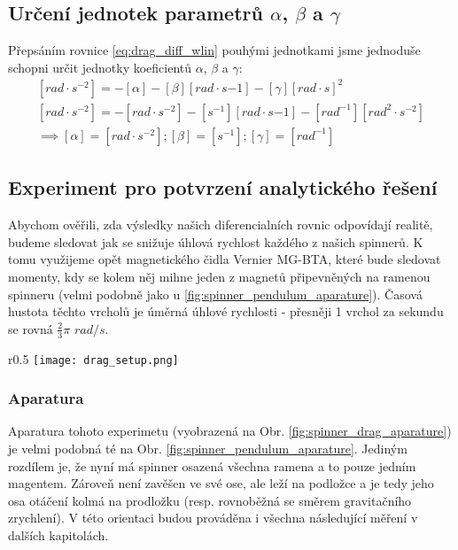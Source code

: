 \documentclass[12pt, a4paper,
 twoside,        %
 openright
]{report}
\begin{document}
\subsection{Určení jednotek parametrů $\alpha$, $\beta$ a $\gamma$}

Přepsáním rovnice \ref{eq:drag_diff_wlin} pouhými jednotkami jsme jednoduše schopni určit jednotky koeficientů $\alpha$, $\beta$ a $\gamma$:
\begin{equation}
    \label{eq:drag_units}
    \begin{gathered}
        [rad \cdot s^{-2}] = - [\alpha] - [\beta] [rad \cdot s{-1}] - [\gamma] [rad \cdot s]^2 \\
        [rad \cdot s^{-2}] = - [rad \cdot s^{-2}] - [s^{-1}] [rad \cdot s{-1}] - [rad^{-1}] [rad^2 \cdot s^{-2}] \\
        \implies [\alpha] = [rad \cdot s^{-2}]; [\beta] = [s^{-1}]; [\gamma] = [rad^{-1}]
    \end{gathered}
\end{equation}

\clearpage

\subsection{Experiment pro potvrzení analytického řešení}

Abychom ověřili, zda výsledky našich diferencialních rovnic odpovídají realitě, budeme sledovat jak se snižuje úhlová rychlost každého z našich spinnerů. K tomu využijeme opět magnetického čidla Vernier MG-BTA, které bude sledovat momenty, kdy se kolem něj mihne jeden z magnetů připevněných na ramenou spinneru (velmi podobně jako u \ref{fig:spinner_pendulum_aparature}). Časová hustota těchto vrcholů je úměrná úhlové rychlosti - přesněji 1 vrchol za sekundu se rovná $\frac{2}{3}\pi$ $rad/s$.

\begin{wrapfigure}{r}{0.5\textwidth}
    \vspace*{-1.5cm}
    \texttt{[image: drag\_setup.png]}
    \centering
    \caption{Ilustrace aparatury pro měření přibližné úhlové rychlosti spinneru}
    \label{fig:spinner_drag_aparature}
\end{wrapfigure}

\subsubsection{Aparatura}
Aparatura tohoto experimetu (vyobrazená na Obr. \ref{fig:spinner_drag_aparature}) je velmi podobná té na Obr. \ref{fig:spinner_pendulum_aparature}. Jediným rozdílem je, že nyní má spinner osazená všechna ramena a to pouze jedním magentem. Zároveň není zavěšen ve své ose, ale leží na podložce a je tedy jeho osa otáčení kolmá na prodložku (resp. rovnoběžná se směrem gravitačního zrychlení). V této orientaci budou prováděna i všechna následující měření v dalších kapitolách.
\end{document}
